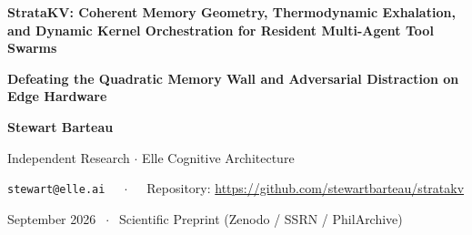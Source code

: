 \documentclass[11pt,letterpaper]{article}
\theoremstyle{definition}
\begin{document}
\begin{center}
\vspace*{0.05in}
{\huge\bfseries StrataKV: Coherent Memory Geometry, Thermodynamic Exhalation, and Dynamic Kernel Orchestration for Resident Multi-Agent Tool Swarms\par}
\vspace{6pt}
{\large\bfseries Defeating the Quadratic Memory Wall and Adversarial Distraction on Edge Hardware\par}
\vspace{12pt}
{\large\bfseries Stewart Barteau\par}
\vspace{3pt}
{\normalsize Independent Research $\cdot$ Elle Cognitive Architecture\par}
\vspace{2pt}
{\small \texttt{stewart@elle.ai} $\quad\cdot\quad$ Repository: \url{https://github.com/stewartbarteau/stratakv}\par}
\vspace{2pt}
{\small September 2026 $\;\cdot\;$ Scientific Preprint (Zenodo / SSRN / PhilArchive)\par}
\vspace{14pt}
\end{center}
\end{document}
